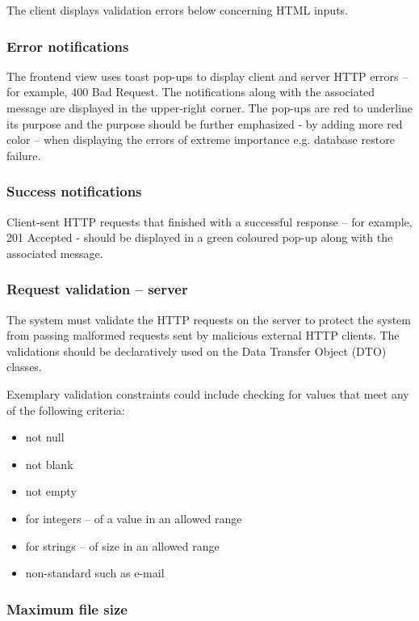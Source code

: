 \documentclass[a4paper,twoside,12pt]{book}
\begin{document}
The client displays validation errors below concerning HTML inputs.

\subsubsection{Error notifications}

The frontend view uses toast pop-ups to display client and server HTTP errors \cite{bib:rfc7231} – for example, 400 Bad Request. The notifications along with the associated message are displayed in the upper-right corner. The pop-ups are red to underline its purpose and the purpose should be further emphasized - by adding more red color – when displaying the errors of extreme importance e.g. database restore failure.

\subsubsection{Success notifications}

Client-sent HTTP requests that finished with a successful response \cite{bib:rfc7231} – for example, 201 Accepted - should be displayed in a green coloured pop-up along with the associated message.

\subsubsection{Request validation – server}

The system must validate the HTTP requests on the server to protect the system from passing malformed requests sent by malicious external HTTP clients. The validations should be declaratively used on the Data Transfer Object (DTO) classes. 

Exemplary validation constraints could include checking for values that meet any of the following criteria:
\begin{itemize}
\item not null
\item not blank
\item not empty
\item for integers – of a value in an allowed range
\item for strings – of size in an allowed range
\item non-standard such as e-mail
\end{itemize}

\subsubsection{Maximum file size}
\end{document}
